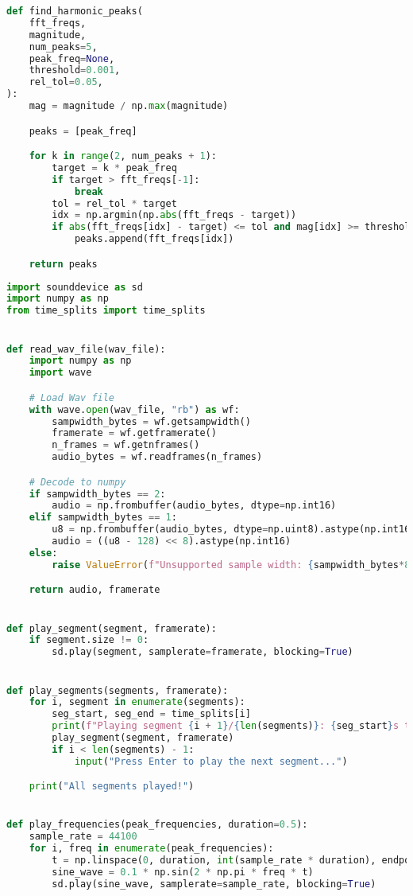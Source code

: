 \begin{lstlisting}[language=Python, caption={fft.py}, label={lst:fft}]
def find_harmonic_peaks(
    fft_freqs,
    magnitude,
    num_peaks=5,
    peak_freq=None,
    threshold=0.001,
    rel_tol=0.05,
):
    mag = magnitude / np.max(magnitude)

    peaks = [peak_freq]

    for k in range(2, num_peaks + 1):
        target = k * peak_freq
        if target > fft_freqs[-1]:
            break
        tol = rel_tol * target
        idx = np.argmin(np.abs(fft_freqs - target))
        if abs(fft_freqs[idx] - target) <= tol and mag[idx] >= threshold:
            peaks.append(fft_freqs[idx])

    return peaks

    \end{lstlisting}

\begin{lstlisting}[language=Python, caption={audio.py}, label={lst:audio}]
import sounddevice as sd
import numpy as np
from time_splits import time_splits


def read_wav_file(wav_file):
    import numpy as np
    import wave

    # Load Wav file
    with wave.open(wav_file, "rb") as wf:
        sampwidth_bytes = wf.getsampwidth()
        framerate = wf.getframerate()
        n_frames = wf.getnframes()
        audio_bytes = wf.readframes(n_frames)

    # Decode to numpy
    if sampwidth_bytes == 2:
        audio = np.frombuffer(audio_bytes, dtype=np.int16)
    elif sampwidth_bytes == 1:
        u8 = np.frombuffer(audio_bytes, dtype=np.uint8).astype(np.int16)
        audio = ((u8 - 128) << 8).astype(np.int16)
    else:
        raise ValueError(f"Unsupported sample width: {sampwidth_bytes*8} bits")

    return audio, framerate


def play_segment(segment, framerate):
    if segment.size != 0:
        sd.play(segment, samplerate=framerate, blocking=True)


def play_segments(segments, framerate):
    for i, segment in enumerate(segments):
        seg_start, seg_end = time_splits[i]
        print(f"Playing segment {i + 1}/{len(segments)}: {seg_start}s to {seg_end}s")
        play_segment(segment, framerate)
        if i < len(segments) - 1:
            input("Press Enter to play the next segment...")

    print("All segments played!")


def play_frequencies(peak_frequencies, duration=0.5):
    sample_rate = 44100
    for i, freq in enumerate(peak_frequencies):
        t = np.linspace(0, duration, int(sample_rate * duration), endpoint=False)
        sine_wave = 0.1 * np.sin(2 * np.pi * freq * t)
        sd.play(sine_wave, samplerate=sample_rate, blocking=True)

\end{lstlisting}

